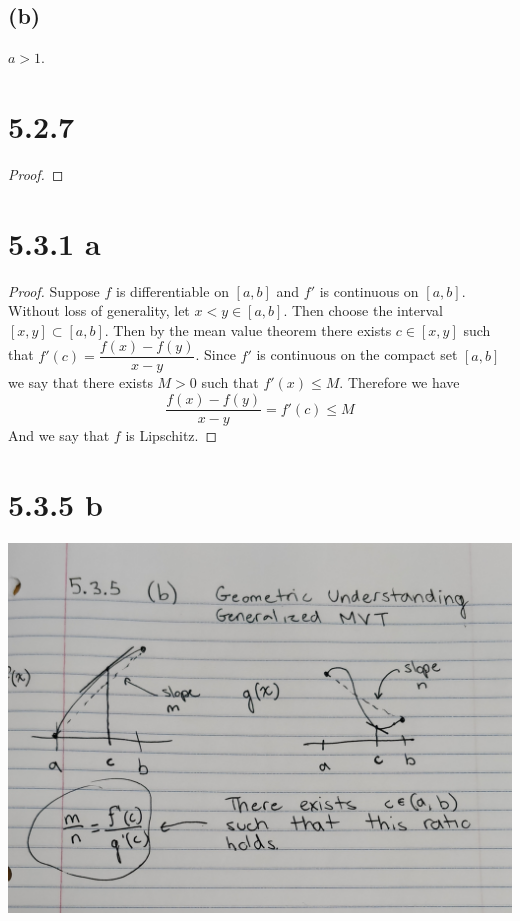 \documentclass{article}
\begin{document}
\subsection*{(b)}
$a >1$.

\section*{5.2.7}
\begin{proof}
\end{proof}

\section*{5.3.1 a}
\begin{proof}
Suppose $f$ is differentiable on $[a,b]$ and $f'$ is continuous on $[a,b]$. Without loss of generality, let $x < y \in [a,b]$. Then choose the interval $[x,y] \subset [a,b]$. Then by the mean value theorem there exists $c \in [x,y]$ such that $f'(c) = \dfrac{f(x)-f(y)}{x-y}$. Since $f'$ is continuous on the compact set $[a,b]$ we say that there exists $M>0$ such that $f'(x) \leqslant M$. Therefore we have
\[ \frac{f(x) - f(y)}{x-y} = f'(c) \leqslant M \]
And we say that $f$ is Lipschitz.
\end{proof}

\section*{5.3.5 b}
\includegraphics[scale=0.1]{pic.jpg}
\end{document}
